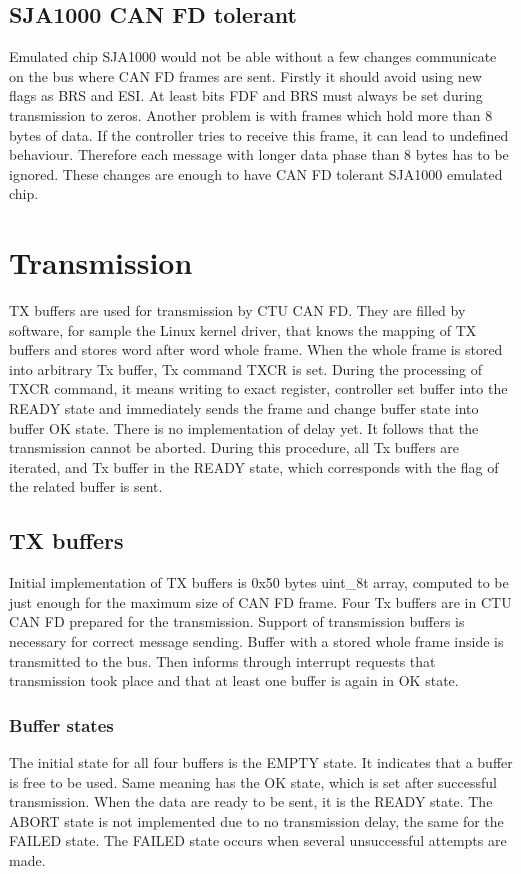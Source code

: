 \documentclass{ctuthesis}
\begin{document}
 \subsection{SJA1000 CAN FD tolerant}
 Emulated chip SJA1000 would not be able without a few changes communicate on the bus where CAN FD frames are sent. Firstly it should avoid using new flags as BRS and ESI. At least bits FDF and BRS must always be set during transmission to zeros. Another problem is with frames which hold more than 8 bytes of data. If the controller tries to receive this frame, it can lead to undefined behaviour. Therefore each message with longer data phase than 8 bytes has to be ignored. These changes are enough to have  CAN FD tolerant SJA1000 emulated chip.

 \section{Transmission}
  TX buffers are used for transmission by CTU CAN FD. They are filled by software, for sample the Linux kernel driver, that knows the mapping of TX buffers and stores word after word whole frame. When the whole frame is stored into arbitrary Tx buffer, Tx command TXCR is set. During the processing of TXCR command, it means writing to exact register, controller set buffer into the READY state and immediately sends the frame and change buffer state into buffer OK state. There is no implementation of delay yet. It follows that the transmission cannot be aborted. During this procedure, all Tx buffers are iterated, and Tx buffer in the READY state, which corresponds with the flag of the related buffer is sent.

 \subsection{TX buffers}
  Initial implementation of TX buffers is 0x50 bytes uint\_8t array, computed to be just enough for the maximum size of CAN FD frame. Four Tx buffers are in CTU CAN FD prepared for the transmission. Support of transmission buffers is necessary for correct message sending. Buffer with a stored whole frame inside is transmitted to the bus. Then informs through interrupt requests that transmission took place and that at least one buffer is again in OK state.

  \subsubsection{Buffer states}
  The initial state for all four buffers is the EMPTY state. It indicates that a buffer is free to be used. Same meaning has the OK state, which is set after successful transmission. When the data are ready to be sent, it is the READY state. The ABORT state is not implemented due to no transmission delay, the same for the FAILED state. The FAILED state occurs when several unsuccessful attempts are made.
 
\end{document}
